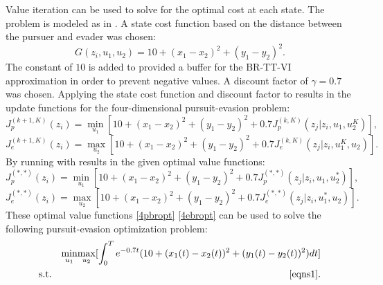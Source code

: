 Value iteration can be used to solve for the optimal cost at each state. The problem is modeled as in . A state cost function based on the distance between the pursuer and evader was chosen: 
\begin{equation}\label{4cost}
G(z_i,u_1,u_2)= 10+(x_1-x_2)^2+(y_1-y_2)^2.
\end{equation}
The constant of $10$ is added to provided a buffer for the BR-TT-VI approximation in order to prevent negative values. A discount factor of $\gamma = 0.7$ was chosen. Applying the state cost function and discount factor to  results in the update functions for the four-dimensional pursuit-evasion problem:
\begin{equation}\label{4pbell}
J_p^{(k+1,K)}(z_i)= \underset{u_1 }{\operatorname{min }}[10+(x_1-x_2)^2+(y_1-y_2)^2+0.7 J_p^{(k,K)}(z_j|z_i,u_1,u_2^K)],
\end{equation}
\begin{equation}\label{4ebell}
J_e^{(k+1,K)}(z_i)= \underset{u_2 }{\operatorname{max }}[10+(x_1-x_2)^2+(y_1-y_2)^2+0.7 J_e^{(k,K)}(z_j|z_i,u_1^K,u_2)].
\end{equation} 
By running  with  results in the given optimal value functions:
\begin{equation}\label{4pbropt}
J_p^{(*,*)}(z_i)= \underset{u_1 }{\operatorname{min }}[10+(x_1-x_2)^2+(y_1-y_2)^2+0.7 J_p^{(*,*)}(z_j|z_i,u_1,u_2^*)],
\end{equation}
\begin{equation}\label{4ebropt}
J_e^{(*,*)}(z_i)= \underset{u_2 }{\operatorname{max }}[10+(x_1-x_2)^2+(y_1-y_2)^2+0.7 J_e^{(*,*)}(z_j|z_i,u_1^*,u_2)].
\end{equation}    
These optimal value functions \ref{4pbropt} \ref{4ebropt} can be used to solve the following pursuit-evasion optimization problem:
\begin{eqnarray}\label{4opt}
&&\underset{u_1 }{\operatorname{min }}\underset{u_2 }{\operatorname{max }}[\int_{0}^{T}e^{-0.7t}(10+(x_1(t)-x_2(t))^2+(y_1(t)-y_2(t))^2)dt]\\
&\textnormal{s.t.}&\ref{eqns1}.
\end{eqnarray}

